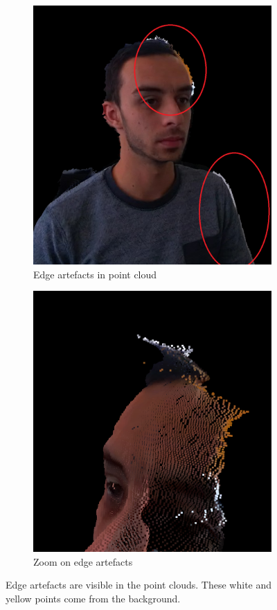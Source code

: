 \begin{figure}[!ht]

\begin{multicols}{2}
        \begin{subfigure}{\linewidth}
               \centering
                \includegraphics[width=.8\linewidth]{images/visual_enhancement/edge/face_white_noise_red.png}
               \caption{Edge artefacts in point cloud}\label{figure:face_white_noise_red}
        \end{subfigure}
        
        
        \begin{subfigure}{\linewidth}
               \centering
             \includegraphics[width=.8\linewidth]{images/visual_enhancement/edge/white_noise.png}
               \caption{Zoom on edge artefacts}\label{figure:white_noise}
        \end{subfigure}
\end{multicols}\vspace{-10pt}
\caption{Edge artefacts are visible in the point clouds. These white and yellow points come from the background.}
\label{figure:edge_artefact}


\end{figure}

